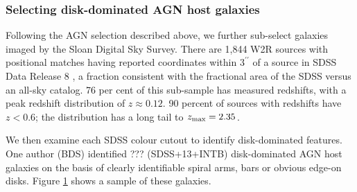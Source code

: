 \subsubsection{Selecting disk-dominated AGN host galaxies}



\begin{figure}
\label{fig:exampleimages}
\end{figure}


Following the AGN selection described above, we further sub-select galaxies imaged by the Sloan Digital Sky Survey. There are 1,844 W2R sources with positional matches having reported coordinates within $3^{\prime \prime}$ of a source in SDSS \citep{york00} Data Release 8 \citep{sdssdr8}, a fraction consistent with the fractional area of the SDSS versus an all-sky catalog. 76 per cent of this sub-sample has measured redshifts, with a peak redshift distribution of $z \approx 0.12$.  90 percent of sources with redshifts have $z < 0.6$; the distribution has a long tail to $z_{\rm max} = 2.35$.

We then examine each SDSS colour cutout to identify disk-dominated features. One author (BDS) identified ??? (SDSS+13+INTB) disk-dominated AGN host galaxies on the basis of clearly identifiable spiral arms, bars or obvious edge-on disks. Figure \ref{fig:exampleimages} shows a sample of these galaxies.



